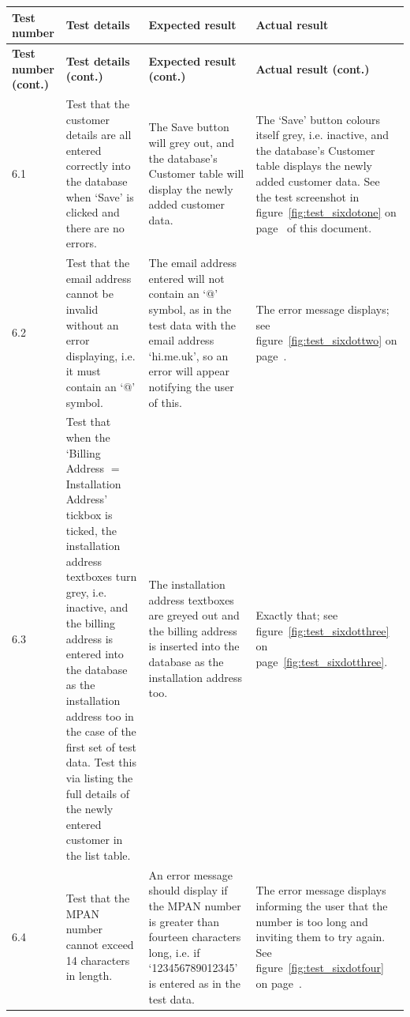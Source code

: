 \begin{longtable}{ | p{2cm} | p{4cm} | p{4cm} | p{4cm} | }
	\hline
	\textbf{Test number} & \textbf{Test details} & \textbf{Expected result} & \textbf{Actual result}\\
	\endfirsthead
	\hline
	\textbf{Test number (cont.)} & \textbf{Test details (cont.)} & \textbf{Expected result (cont.)} & \textbf{Actual result (cont.)}\\
	\endhead
	\hline
	6.1 & Test that the customer details are all entered correctly into the database when `Save' is clicked and there are no errors. & The Save button will grey out, and the database's Customer table will display the newly added customer data. & The `Save' button colours itself grey, i.e. inactive, and the database's Customer table displays the newly added customer data.  See the test screenshot in figure~\ref{fig:test_sixdotone} on page~\pageref{fig:test_sixdotone} of this document.\\
	\hline
	6.2 & Test that the email address cannot be invalid without an error displaying, i.e. it must contain an `@' symbol. & The email address entered will not contain an `@' symbol, as in the test data with the email address `hi.me.uk', so an error will appear notifying the user of this. & The error message displays; see figure~\ref{fig:test_sixdottwo} on page~\pageref{fig:test_sixdottwo}.\\
	\hline
	6.3 & Test that when the `Billing Address $=$ Installation Address' tickbox is ticked, the installation address textboxes turn grey, i.e. inactive, and the billing address is entered into the database as the installation address too in the case of the first set of test data.  Test this via listing the full details of the newly entered customer in the list table. & The installation address textboxes are greyed out and the billing address is inserted into the database as the installation address too. & Exactly that; see figure~\ref{fig:test_sixdotthree} on page~\ref{fig:test_sixdotthree}.\\
	\hline
	6.4 & Test that the MPAN number cannot exceed 14 characters in length. & An error message should display if the MPAN number is greater than fourteen characters long, i.e. if `123456789012345' is entered as in the test data. & The error message displays informing the user that the number is too long and inviting them to try again.  See figure~\ref{fig:test_sixdotfour} on page~\pageref{fig:test_sixdotfour}.\\
	\hline
\end{longtable}

